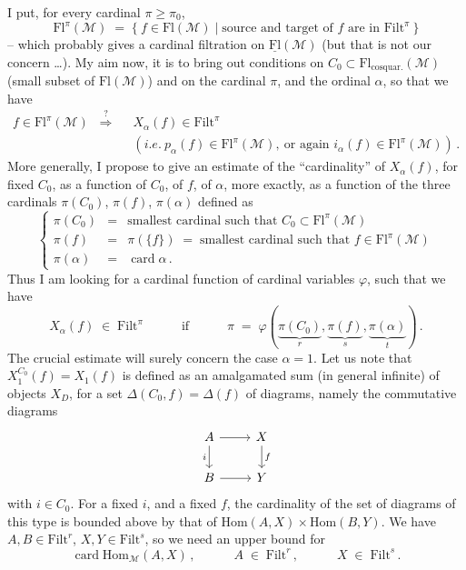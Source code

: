 \documentclass[11pt]{article}
\newcommand{\printedpage}[1]{\marginpar{\footnotesize p.~#1}}
\newcommand{\msp}[1]{\marginpar{\footnotesize [#1]}}
\newcommand{\uFl}{\underline{\mathrm{Fl}}}
\newcommand{\Fl}{\mathrm{Fl}}
\newcommand{\Filt}{\mathrm{Filt}}
\newcommand{\cM}{\mathcal{M}}
\newcommand{\card}{\operatorname{card}}
\begin{document}
I put, for every cardinal $\pi\geq\pi_0$,
\[
\Fl^\pi(\cM) \;=\; \{\ f\in\Fl(\cM) \mid \text{source and target of $f$ are in } \Filt^\pi\ \}
\tag*{(3.3)}
\]
-- which probably gives a cardinal filtration on $\uFl(\cM)$ (but that is not our concern \ldots). My aim now, it is to bring out conditions on $C_0\subset\Fl_{\text{cosquar.}}(\cM)$ (small subset of $\Fl(\cM)$) and on the cardinal $\pi$, and the ordinal $\alpha$, so that we have
\[
\begin{aligned}
f\in\Fl^\pi(\cM) \;\;\overset{?}{\Longrightarrow}\;\; & X_\alpha(f)\in\Filt^\pi \\
& (\textit{i.e.}\ p_\alpha(f)\in\Fl^\pi(\cM),\ \text{or again } i_\alpha(f)\in\Fl^\pi(\cM))\,.
\end{aligned}
\tag*{(3.4)}
\]
More generally, I propose to give an estimate of the ``cardinality'' of $X_\alpha(f)$, for fixed $C_0$, as a function of $C_0$, of $f$, of $\alpha$, more exactly, as a function of the three cardinals $\pi(C_0)$, $\pi(f)$, $\pi(\alpha)$ defined as
\[
\left\{
\begin{array}{rcl}
\pi(C_0) & = & \text{smallest cardinal such that } C_0\subset\Fl^\pi(\cM) \\[1ex]
\pi(f) & = & \pi(\{f\}) \;=\; \text{smallest cardinal such that } f\in\Fl^\pi(\cM) \\[1ex]
\pi(\alpha) & = & \card\alpha\,.
\end{array}
\right.
\tag*{(3.5)}
\]
Thus I am looking for a cardinal
\msp{page 18}
function of cardinal variables $\varphi$, such that we have
\[
X_\alpha(f) \;\in\; \Filt^\pi \qquad\quad \text{if} \qquad\quad \pi \;=\; \varphi(\underbrace{\pi(C_0)}_{r},\underbrace{\pi(f)}_{s},\underbrace{\pi(\alpha)}_{t})\,.
\tag*{(3.6)}
\]
The crucial estimate will surely concern the case $\alpha=1$. Let us note that $X_1^{C_0}(f)=X_1(f)$ is defined as an amalgamated sum (in general infinite) of objects $X_D$, for a set $\Delta(C_0,f)=\Delta(f)$ of diagrams, namely the commutative diagrams
\[
\begin{tikzcd}
A \arrow[r] \arrow[d, "i"'] & X \arrow[d, "f"] \\
B \arrow[r] & Y
\end{tikzcd}
\]
\printedpage{13}
with $i\in C_0$. For a fixed $i$, and a fixed $f$, the cardinality of the set of diagrams of this type is bounded above by that of $\mathrm{Hom}(A,X)\times\mathrm{Hom}(B,Y)$. We have $A,B\in\Filt^r$, $X,Y\in\Filt^s$, so we need an upper bound for
\[
\card\mathrm{Hom}_{\cM}(A,X)\,, \qquad\quad A\;\in\;\Filt^r\,, \qquad\quad X\;\in\;\Filt^s\,.
\]
\end{document}
